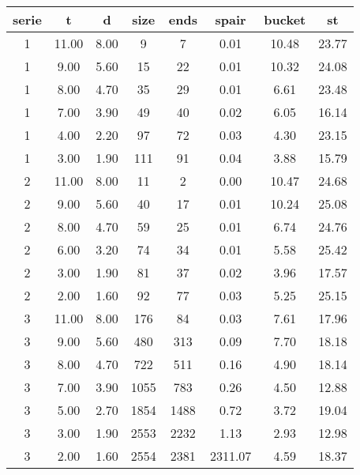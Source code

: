 \begin{tabular}{|c|c|c|c|c|c|c|c|}
\hline
\textbf{serie} & \textbf{t} & \textbf{d} & \textbf{size} & \textbf{ends} & \textbf{spair} & \textbf{bucket} & \textbf{st}\\
\hline
1 & 11.00 & 8.00 & 9 & 7 & 0.01 & 10.48 & 23.77\\
\hline
1 & 9.00 & 5.60 & 15 & 22 & 0.01 & 10.32 & 24.08\\
\hline
1 & 8.00 & 4.70 & 35 & 29 & 0.01 & 6.61 & 23.48\\
\hline
1 & 7.00 & 3.90 & 49 & 40 & 0.02 & 6.05 & 16.14\\
\hline
1 & 4.00 & 2.20 & 97 & 72 & 0.03 & 4.30 & 23.15\\
\hline
1 & 3.00 & 1.90 & 111 & 91 & 0.04 & 3.88 & 15.79\\
\hline

2 & 11.00 & 8.00 & 11 & 2 & 0.00 & 10.47 & 24.68\\
\hline
2 & 9.00 & 5.60 & 40 & 17 & 0.01 & 10.24 & 25.08\\
\hline
2 & 8.00 & 4.70 & 59 & 25 & 0.01 & 6.74 & 24.76\\
\hline
2 & 6.00 & 3.20 & 74 & 34 & 0.01 & 5.58 & 25.42\\
\hline
2 & 3.00 & 1.90 & 81 & 37 & 0.02 & 3.96 & 17.57\\
\hline
2 & 2.00 & 1.60 & 92 & 77 & 0.03 & 5.25 & 25.15\\
\hline

3 & 11.00 & 8.00 & 176 & 84 & 0.03 & 7.61 & 17.96\\
\hline
3 & 9.00 & 5.60 & 480 & 313 & 0.09 & 7.70 & 18.18\\
\hline
3 & 8.00 & 4.70 & 722 & 511 & 0.16 & 4.90 & 18.14\\
\hline
3 & 7.00 & 3.90 & 1055 & 783 & 0.26 & 4.50 & 12.88\\
\hline
3 & 5.00 & 2.70 & 1854 & 1488 & 0.72 & 3.72 & 19.04\\
\hline
3 & 3.00 & 1.90 & 2553 & 2232 & 1.13 & 2.93 & 12.98\\
\hline
3 & 2.00 & 1.60 & 2554 & 2381 & 2311.07 & 4.59 & 18.37\\
\hline
\end{tabular}

